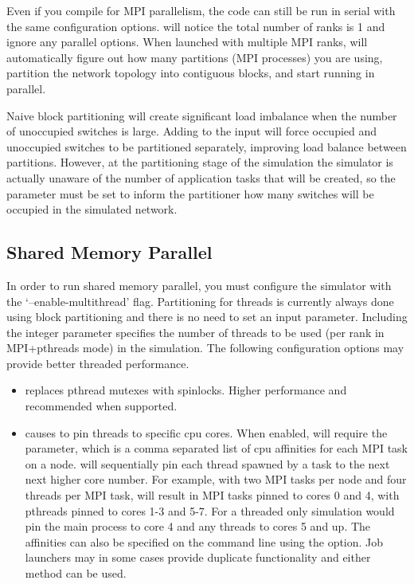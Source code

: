 Even if you compile for MPI parallelism, the code can still be run in serial with the same configuration options.
\sstmacro will notice the total number of ranks is 1 and ignore any parallel options.
When launched with multiple MPI ranks, \sstmacro will automatically figure out how many partitions (MPI processes) 
you are using, partition the network topology into contiguous blocks, and start running in parallel.   

Naive block partitioning will create significant load imbalance when the number of unoccupied switches is large.
Adding  to the input will force occupied and unoccupied switches to be partitioned separately, improving load balance between partitions.
However, at the partitioning stage of the simulation the simulator is actually unaware of the number of application tasks that will be created, so the  parameter must be set to inform the partitioner how many switches will be occupied in the simulated network.



\subsection{Shared Memory Parallel}
\label{subsec:parallelopt}
In order to run shared memory parallel, you must configure the simulator with the `--enable-multithread' flag.
Partitioning for threads is currently always done using block partitioning and there is no need to set an input parameter.
Including the integer parameter  specifies the number of threads to be used (per rank in MPI+pthreads mode) in the simulation.
The following configuration options may provide better threaded performance.
\begin{itemize}
\item{} replaces pthread mutexes with spinlocks.  Higher performance and recommended when supported.
\item{} causes \sstmacro to pin threads to specific cpu cores.  When enabled, \sstmacro will require the
 parameter, which is a comma separated list of cpu affinities for each MPI task on a node.  \sstmacro will sequentially
pin each thread spawned by a task to the next next higher core number.  For example, with two MPI tasks per node and four threads per MPI task,
 will result in MPI tasks pinned to cores 0 and 4, with pthreads pinned to cores 1-3 and 5-7.
For a threaded only simulation  would pin the main process to core 4 and any threads to cores 5 and up.
The affinities can also be specified on the command line using the  option.
Job launchers may in some cases provide duplicate functionality and either method can be used.
\end{itemize}


